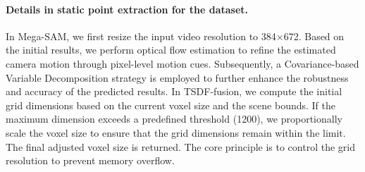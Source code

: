 \paragraph{Details in static point extraction for the dataset.}
In Mega-SAM, we first resize the input video resolution to 384×672. Based on the initial results, we perform optical flow estimation to refine the estimated camera motion through pixel-level motion cues. Subsequently, a Covariance-based Variable Decomposition strategy is employed to further enhance the robustness and accuracy of the predicted results.
In TSDF-fusion, we compute the initial grid dimensions based on the current voxel size and the scene bounds. If the maximum dimension exceeds a predefined threshold (1200), we proportionally scale the voxel size to ensure that the grid dimensions remain within the limit. The final adjusted voxel size is returned. The core principle is to control the grid resolution to prevent memory overflow.




